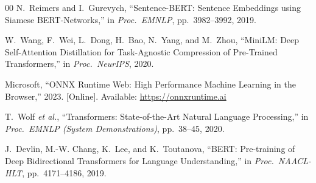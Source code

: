 \documentclass[conference]{IEEEtran}
\begin{document}
\begin{thebibliography}{00}
N.~Reimers and I.~Gurevych, ``Sentence-BERT: Sentence Embeddings using Siamese BERT-Networks,'' in \textit{Proc.\ EMNLP}, pp.~3982--3992, 2019.

W.~Wang, F.~Wei, L.~Dong, H.~Bao, N.~Yang, and M.~Zhou, ``MiniLM: Deep Self-Attention Distillation for Task-Agnostic Compression of Pre-Trained Transformers,'' in \textit{Proc.\ NeurIPS}, 2020.

Microsoft, ``ONNX Runtime Web: High Performance Machine Learning in the Browser,'' 2023. [Online]. Available: \url{https://onnxruntime.ai}

T.~Wolf \textit{et al.}, ``Transformers: State-of-the-Art Natural Language Processing,'' in \textit{Proc.\ EMNLP (System Demonstrations)}, pp.~38--45, 2020.

J.~Devlin, M.-W. Chang, K.~Lee, and K.~Toutanova, ``BERT: Pre-training of Deep Bidirectional Transformers for Language Understanding,'' in \textit{Proc.\ NAACL-HLT}, pp.~4171--4186, 2019.

\end{thebibliography}
\end{document}
